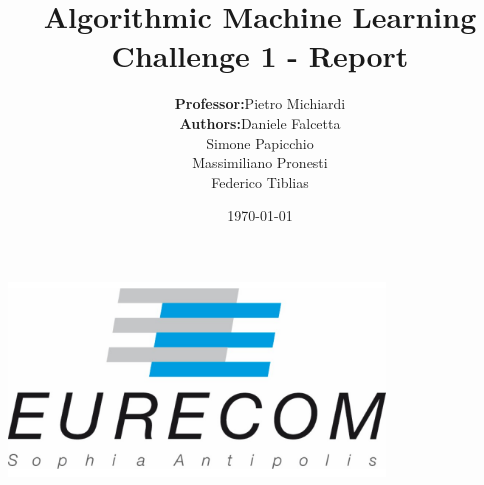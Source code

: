 \title{\Large Algorithmic Machine Learning  \\[0.5cm]
	\bf\Large Challenge 1 - Report }

\author{\large 
	\begin{tabular}{rl}
		\textbf{Professor:} & Pietro Michiardi \\
		\textbf{Authors:} & Daniele Falcetta \\ & Simone Papicchio \\ & Massimiliano Pronesti \\ & Federico Tiblias
	\end{tabular}
	}
\date{\large \today}

\makeatletter
\begin{titlepage}
	\begin{center}
		{ \includegraphics[width=10cm]{assets/eurecom.png}}
		{\ \\ \ \\}
		\vbox{}\vspace{5cm}
		{\@title }\\[3cm] 
		{\@author}\\[3cm]
		{\@date\\}
		
	\end{center}
\end{titlepage}
\makeatother